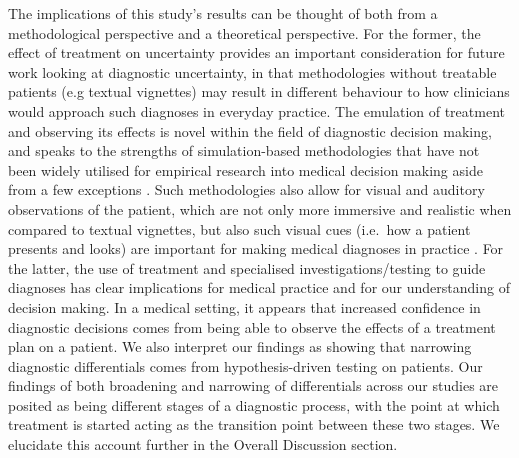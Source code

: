 \documentclass[a4paper, nobind]{templates/ociamthesis}
\begin{document}
The implications of this study's results can be thought of both from a methodological perspective and a theoretical perspective. For the former, the effect of treatment on uncertainty provides an important consideration for future work looking at diagnostic uncertainty, in that methodologies without treatable patients (e.g textual vignettes) may result in different behaviour to how clinicians would approach such diagnoses in everyday practice. The emulation of treatment and observing its effects is novel within the field of diagnostic decision making, and speaks to the strengths of simulation-based methodologies that have not been widely utilised for empirical research into medical decision making aside from a few exceptions \autocite{schmidt_simulation_2013,jans_examining_2023}. Such methodologies also allow for visual and auditory observations of the patient, which are not only more immersive and realistic when compared to textual vignettes, but also such visual cues (i.e.~how a patient presents and looks) are important for making medical diagnoses in practice \autocite{sibbald_eyeballing_2017}. For the latter, the use of treatment and specialised investigations/testing to guide diagnoses has clear implications for medical practice and for our understanding of decision making. In a medical setting, it appears that increased confidence in diagnostic decisions comes from being able to observe the effects of a treatment plan on a patient. We also interpret our findings as showing that narrowing diagnostic differentials comes from hypothesis-driven testing on patients. Our findings of both broadening and narrowing of differentials across our studies are posited as being different stages of a diagnostic process, with the point at which treatment is started acting as the transition point between these two stages. We elucidate this account further in the Overall Discussion section.
\end{document}
